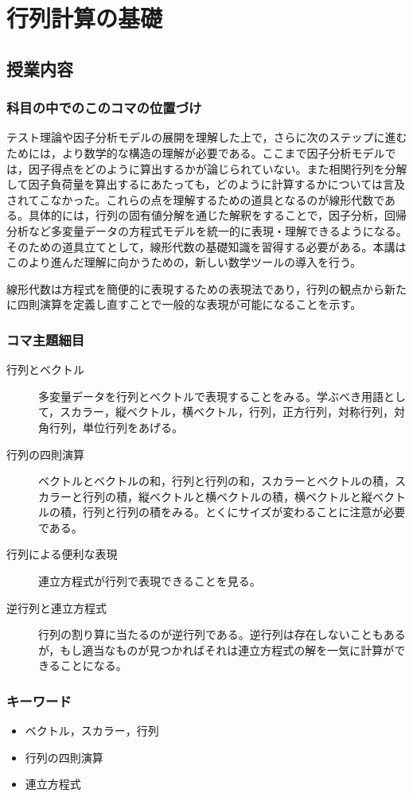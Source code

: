 \section{行列計算の基礎}
\subsection{授業内容}
\subsubsection{科目の中でのこのコマの位置づけ}
テスト理論や因子分析モデルの展開を理解した上で，さらに次のステップに進むためには，より数学的な構造の理解が必要である。ここまで因子分析モデルでは，因子得点をどのように算出するかが論じられていない。また相関行列を分解して因子負荷量を算出するにあたっても，どのように計算するかについては言及されてこなかった。これらの点を理解するための道具となるのが線形代数である。具体的には，行列の固有値分解を通じた解釈をすることで，因子分析，回帰分析など多変量データの方程式モデルを統一的に表現・理解できるようになる。そのための道具立てとして，線形代数の基礎知識を習得する必要がある。本講はこのより進んだ理解に向かうための，新しい数学ツールの導入を行う。

線形代数は方程式を簡便的に表現するための表現法であり，行列の観点から新たに四則演算を定義し直すことで一般的な表現が可能になることを示す。

\subsubsection{コマ主題細目}
\begin{description}
	\item[行列とベクトル] 多変量データを行列とベクトルで表現することをみる。学ぶべき用語として，スカラー，縦ベクトル，横ベクトル，行列，正方行列，対称行列，対角行列，単位行列をあげる。
	\item[行列の四則演算] ベクトルとベクトルの和，行列と行列の和，スカラーとベクトルの積，スカラーと行列の積，縦ベクトルと横ベクトルの積，横ベクトルと縦ベクトルの積，行列と行列の積をみる。とくにサイズが変わることに注意が必要である。
	\item[行列による便利な表現] 連立方程式が行列で表現できることを見る。
	\item[逆行列と連立方程式] 行列の割り算に当たるのが逆行列である。逆行列は存在しないこともあるが，もし適当なものが見つかればそれは連立方程式の解を一気に計算ができることになる。
\end{description}
\subsubsection{キーワード}
\begin{itemize}
	\item ベクトル，スカラー，行列
	\item 行列の四則演算
	\item 連立方程式
\end{itemize}
